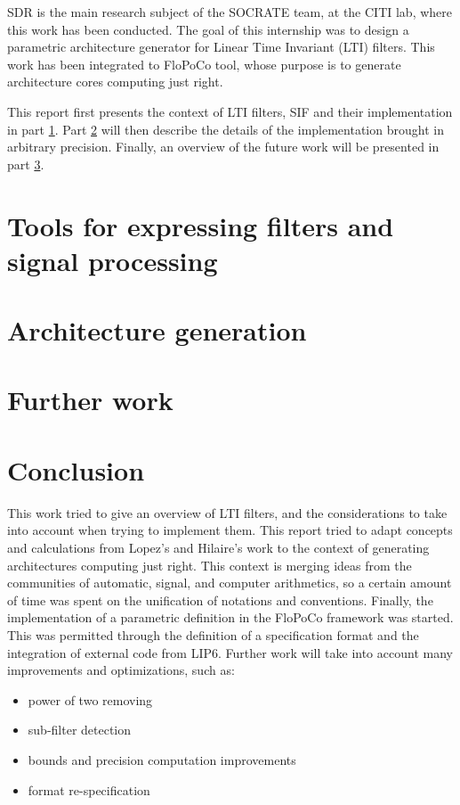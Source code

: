 \documentclass[twoside]{article}
\theoremstyle{remark}
\numberwithin{equation}{subsection}
\begin{document}
	
	SDR is the main research subject of the SOCRATE team, at the CITI lab, where this work has been conducted.
	The goal of this internship was to design a parametric architecture generator for Linear Time Invariant (LTI) filters.
	This work has been integrated to FloPoCo tool,
	whose purpose is to generate architecture cores computing just right.


	This report first presents the context of LTI filters, SIF and their implementation in part \ref{Part1}.
	Part \ref{Part2} will then describe the details of the implementation brought in arbitrary precision.
	Finally, an overview of the future work will be presented in part \ref{Part3}.

\section{Tools for expressing filters and signal processing}
\label{Part1}


\section{Architecture generation}
\label{Part2}


\section{Further work}
\label{Part3}


\section*{Conclusion}
	This work tried to give an overview of LTI filters, and the considerations to take into account when trying to implement them.
	This report tried to adapt concepts and calculations from Lopez's and Hilaire's work to the context of generating architectures computing just right.
	This context is merging ideas from the communities of automatic, signal, and computer arithmetics, so a certain amount of time was spent on the unification of notations and conventions.
	Finally, the implementation of a parametric definition in the FloPoCo framework was started.
	This was permitted through the definition of a specification format and the integration of external code from LIP6.
	Further work will take into account many improvements and optimizations, such as:
	\begin{itemize}
		\item power of two removing \vspace{-10pt}
		\item sub-filter detection \vspace{-10pt}
		\item bounds and precision computation improvements \vspace{-10pt}
		\item format re-specification \vspace{-10pt}
	\end{itemize}
\end{document}
